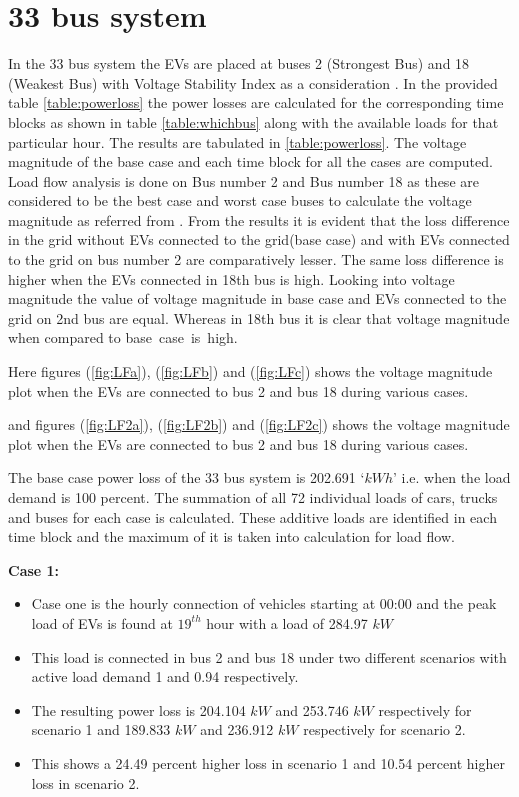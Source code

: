 	
	\section{33 bus system}
		In the 33 bus system the EVs are placed at buses 2 (Strongest Bus) and 18 (Weakest Bus) with Voltage Stability Index as a consideration \cite{33bus} .
 		In the provided table \ref{table:powerloss} the power losses are calculated for the corresponding time blocks  as shown in table \ref{table:whichbus} along with the available loads for that particular hour. The results are tabulated in \ref{table:powerloss}.
 		The voltage magnitude of the base case and each time block for  all the cases are computed. Load flow analysis is done on Bus number 2 and Bus number 18 as these are considered to be the best case and worst case buses to calculate the voltage magnitude as referred from \cite{33bus}. From the results it is evident that the loss difference in the grid without EVs connected to the grid(base case) and with EVs connected to the grid on bus number 2 are comparatively lesser. The same loss difference is higher when the EVs connected in 18th bus is high. Looking into voltage magnitude the value of voltage magnitude in base case and EVs connected to the grid on 2nd bus are equal. Whereas in 18th bus it is clear that voltage magnitude when compared to base case is high.
 		
 		\noindent Here figures (\ref{fig:LFa}), (\ref{fig:LFb}) and  (\ref{fig:LFc}) shows the voltage magnitude plot when the EVs are connected to bus 2 and bus 18 during various cases.
 		
 		\noindent and figures (\ref{fig:LF2a}), (\ref{fig:LF2b}) and  (\ref{fig:LF2c}) shows the voltage magnitude plot when the EVs are connected to bus 2 and bus 18 during various cases.
 		
 		
 		
 		
 		
 		\noindent The base case power loss of the 33 bus system is 202.691 `$kWh$' i.e. when the load demand is 100 percent. The summation of all 72 individual loads of cars, trucks and buses for each case is calculated. These additive loads are identified in each time block and the maximum of it is taken into calculation for load flow.

 		\textbf{Case 1:}
 			\begin{itemize}
 				\item Case one is the hourly connection of vehicles starting at 00:00 and the peak load of EVs is found at $19^{th}$ hour with a load of 284.97 $kW$ 
 				\item This load is connected in bus 2 and bus 18 under two different scenarios with active load demand 1 and 0.94 respectively.
 				\item The resulting power loss is 204.104 $kW$ and 253.746 $kW$ respectively for scenario 1 and 189.833 $kW$ and 236.912 $kW$ respectively for scenario 2.
 				\item This shows a 24.49 percent higher loss in scenario 1 and 10.54 percent higher loss in scenario 2.
 			\end{itemize}

